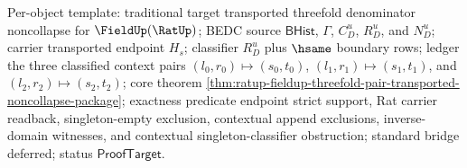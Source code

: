 Per-object template: traditional target transported threefold denominator
noncollapse for $\FieldUp(\RatUp)$; BEDC source $\mathsf{BHist}$, $\Gamma$,
$C_D^u$, $R_D^u$, and $N_D^u$; carrier transported endpoint $H_s$; classifier
$R_D^u$ plus $\hsame$ boundary rows; ledger the three classified context pairs
$(l_0,r_0)\mapsto(s_0,t_0)$, $(l_1,r_1)\mapsto(s_1,t_1)$, and
$(l_2,r_2)\mapsto(s_2,t_2)$; core theorem
\autoref{thm:ratup-fieldup-threefold-pair-transported-noncollapse-package};
exactness predicate endpoint strict support, Rat carrier readback,
singleton-empty exclusion, contextual append exclusions, inverse-domain
witnesses, and contextual singleton-classifier obstruction; standard bridge
deferred; status $\mathsf{ProofTarget}$.




